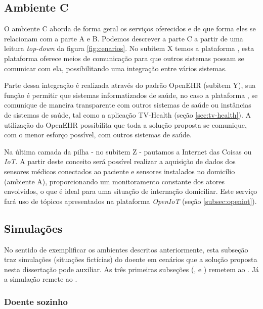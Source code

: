 \subsection{Ambiente C} \label{subsec:ambiente-c}

O ambiente C aborda de forma geral os serviços oferecidos e de que forma eles se
relacionam com a parte A e B. Podemos descrever a parte C a partir de uma leitura 
\textit{top-down} da figura \ref{fig:cenarios}. No subitem X temos a plataforma
\nextsaude[], esta plataforma oferece meios de comunicação para que outros sistemas
possam se comunicar com ela, possibilitando uma integração entre vários sistemas.

Parte dessa integração é realizada através do padrão OpenEHR (subitem Y), sua 
função é permitir que sistemas informatizados de saúde, no caso a plataforma
\nextsaude[], se comunique de maneira transparente com outros sistemas de saúde ou
instâncias de sistemas de saúde, tal como a aplicação TV-Health (seção
\vref{sec:tv-health}). A utilização do OpenEHR possibilita que toda a solução
proposta se comunique, com o menor esforço possível, com outros sistemas de 
saúde.

Na última camada da pilha - no subitem Z - pautamos a Internet das Coisas ou
\textit{IoT}. A partir deste conceito será possível realizar a aquisição de
dados dos sensores médicos conectados ao paciente e sensores instalados no domicílio
(ambiente A), proporcionando um monitoramento constante dos atores envolvidos, 
o que é ideal para uma situação de internação domiciliar. Este serviço fará uso 
de tópicos apresentados na plataforma \textit{OpenIoT}
(seção \vref{subsec:openiot}).

\subsection{Simulações} \label{subsec:simulacoes}

No sentido de exemplificar os ambientes descritos anteriormente, esta subseção
traz simulações (situações fictícias) do doente em cenários que a solução
proposta nesta dissertação pode auxiliar. As três primeiras subseções 
(, 
e ) remetem ao .
Já a simulação  remete ao .

\subsubsection{Doente sozinho} \label{subsubsec:doente-sozinho}

